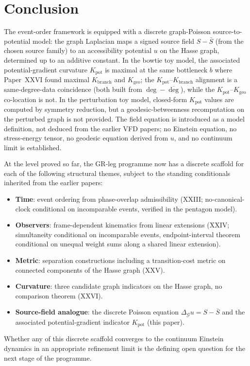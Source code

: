 \documentclass[12pt]{article}
\newcommand{\Gcal}{\mathcal{G}}
\begin{document}
\section{Conclusion}\label{sec:conclusion}

The event-order framework is equipped with a discrete graph-Poisson source-to-potential model: the graph Laplacian maps a signed source field $S - \bar S$ (from the chosen source family) to an accessibility potential $u$ on the Hasse graph, determined up to an additive constant. In the bowtie toy model, the associated potential-gradient curvature $K_{\mathrm{pot}}$ is maximal at the same bottleneck $b$ where Paper~XXVI found maximal $K_{\mathrm{branch}}$ and $K_{\mathrm{geo}}$; the $K_{\mathrm{pot}}$--$K_{\mathrm{branch}}$ alignment is a same-degree-data coincidence (both built from $\deg - \overline{\deg}$), while the $K_{\mathrm{pot}}$--$K_{\mathrm{geo}}$ co-location is not. In the perturbation toy model, closed-form $K_{\mathrm{pot}}$ values are computed by symmetry reduction, but a geodesic-betweenness recomputation on the perturbed graph is not provided. The field equation is introduced as a model definition, not deduced from the earlier VFD papers; no Einstein equation, no stress-energy tensor, no geodesic equation derived from $u$, and no continuum limit is established.

At the level proved so far, the GR-leg programme now has a discrete scaffold for each of the following structural themes, subject to the standing conditionals inherited from the earlier papers:
\begin{itemize}
    \item \textbf{Time}: event ordering from phase-overlap admissibility (XXIII; no-canonical-clock conditional on incomparable events, verified in the pentagon model).
    \item \textbf{Observers}: frame-dependent kinematics from linear extensions (XXIV; simultaneity conditional on incomparable events, endpoint-interval theorem conditional on unequal weight sums along a shared linear extension).
    \item \textbf{Metric}: separation constructions including a transition-cost metric on connected components of the Hasse graph (XXV).
    \item \textbf{Curvature}: three candidate graph indicators on the Hasse graph, no comparison theorem (XXVI).
    \item \textbf{Source-field analogue}: the discrete Poisson equation $\Delta_\Gcal u = S - \bar S$ and the associated potential-gradient indicator $K_{\mathrm{pot}}$ (this paper).
\end{itemize}

Whether any of this discrete scaffold converges to the continuum Einstein dynamics in an appropriate refinement limit is the defining open question for the next stage of the programme.



\end{document}
